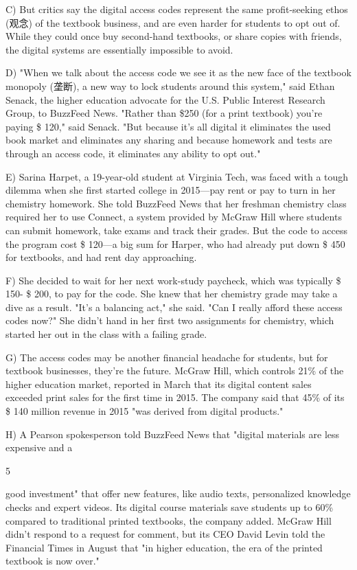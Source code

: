 \documentclass[UTF8,11pt]{ctexart}
\begin{document}
C) But critics say the digital access codes represent the same profit-seeking ethos (观念) of the textbook business, and are even harder for students to opt out of. While they could once buy second-hand textbooks, or share copies with friends, the digital systems are essentially impossible to avoid.


D) "When we talk about the access code we see it as the new face of the textbook monopoly (垄断), a new way to lock students around this system," said Ethan Senack, the higher education advocate for the U.S. Public Interest Research Group, to BuzzFeed News. "Rather than \$250 (for a print textbook) you're paying \$ 120," said Senack. "But because it's all digital it eliminates the used book market and eliminates any sharing and because homework and tests are through an access code, it eliminates any ability to opt out."


E) Sarina Harpet, a 19-year-old student at Virginia Tech, was faced with a tough dilemma when she first started college in 2015—pay rent or pay to turn in her chemistry homework. She told BuzzFeed News that her freshman chemistry class required her to use Connect, a system provided by McGraw Hill where students can submit homework, take exams and track their grades. But the code to access the program cost \$ 120—a big sum for Harper, who had already put down \$ 450 for textbooks, and had rent day approaching.


F) She decided to wait for her next work-study paycheck, which was typically \$ 150- \$ 200, to pay for the code. She knew that her chemistry grade may take a dive as a result. "It's a balancing act," she said. "Can I really afford these access codes now?" She didn't hand in her first two assignments for chemistry, which started her out in the class with a failing grade.


G) The access codes may be another financial headache for students, but for textbook businesses, they're the future. McGraw Hill, which controls 21\% of the higher education market, reported in March that its digital content sales exceeded print sales for the first time in 2015. The company said that 45\% of its \$ 140 million revenue in 2015 "was derived from digital products."


H) A Pearson spokesperson told BuzzFeed News that "digital materials are less expensive and a


5


good investment" that offer new features, like audio texts, personalized knowledge checks and expert videos. Its digital course materials save students up to 60\% compared to traditional printed textbooks, the company added. McGraw Hill didn't respond to a request for comment, but its CEO David Levin told the Financial Times in August that "in higher education, the era of the printed textbook is now over."
\end{document}

